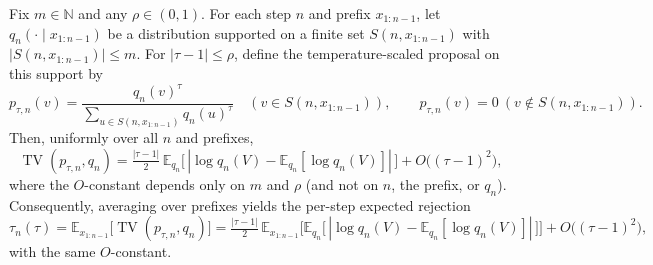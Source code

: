 \begin{theorem}\label{thm:local-temp-sensitivity}
Fix $m\in\mathbb{N}$ and any $\rho\in(0,1)$. For each step $n$ and prefix $x_{1:n-1}$, let $q_n(\cdot\mid x_{1:n-1})$ be a distribution supported on a finite set $S(n,x_{1:n-1})$ with $|S(n,x_{1:n-1})|\le m$. For $|\tau-1|\le\rho$, define the temperature-scaled proposal on this support by
\[
 p_{\tau,n}(v)=\frac{q_n(v)^{\tau}}{\sum_{u\in S(n,x_{1:n-1})} q_n(u)^{\tau}}\quad (v\in S(n,x_{1:n-1})),\qquad p_{\tau,n}(v)=0\ (v\notin S(n,x_{1:n-1})).
\]
Then, uniformly over all $n$ and prefixes,
\[
 \operatorname{TV}(p_{\tau,n},q_n)=\tfrac{|\tau-1|}{2}\,\mathbb{E}_{q_n}\big[\,|\log q_n(V)-\mathbb{E}_{q_n}[\log q_n(V)]|\,\big]+O\big((\tau-1)^2\big),
\]
where the $O$-constant depends only on $m$ and $\rho$ (and not on $n$, the prefix, or $q_n$). Consequently, averaging over prefixes yields the per-step expected rejection
\[
 \tau_n(\tau)=\mathbb{E}_{x_{1:n-1}}\big[\operatorname{TV}(p_{\tau,n},q_n)\big]=\tfrac{|\tau-1|}{2}\,\mathbb{E}_{x_{1:n-1}}\Big[\mathbb{E}_{q_n}\big[\,|\log q_n(V)-\mathbb{E}_{q_n}[\log q_n(V)]|\,\big]\Big]+O\big((\tau-1)^2\big),
\]
with the same $O$-constant.
\end{theorem}

